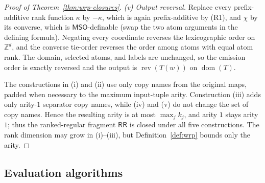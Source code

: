 \documentclass[11pt]{article}
\theoremstyle{definition}
\newcommand{\Z}{\mathbb Z}
\newcommand{\RR}{\mathsf{RR}}
\newcommand{\MSO}{\mathsf{MSO}}
\begin{document}
\begin{proof}[Proof of Theorem~\ref{thm:wrp-closures}]
\vspace{0.5em}
\noindent\emph{(v) Output reversal.}
Replace every prefix-additive rank function $\kappa$ by $-\kappa$, which is
again prefix-additive by
(R1), and $\chi$ by its converse, which is $\MSO$-definable (swap the two atom
arguments in the defining formula).  Negating every coordinate reverses the lexicographic
order on $\Z^d$, and the converse tie-order reverses the order among atoms with
equal atom rank.  The domain, selected atoms, and labels are unchanged, so the
emission order is exactly reversed and the output is
$\operatorname{rev}(T(w))$ on $\operatorname{dom}(T)$.

\vspace{0.5em}
The constructions in (i) and (ii) use only copy names from the original maps,
padded when necessary to the maximum input-tuple arity.  Construction (iii)
adds only arity-$1$ separator copy names, while (iv) and (v) do not change the
set of copy names.  Hence
the resulting arity is at most $\max_j k_j$, and arity $1$ stays arity $1$;
thus the ranked-regular fragment $\RR$ is closed under all five constructions.
The rank dimension may grow in (i)--(iii), but
Definition~\ref{def:wrp} bounds only the arity.
\end{proof}

\subsection{Evaluation algorithms}
\end{document}
